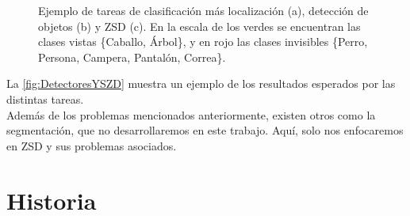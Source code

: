 \begin{figure}[]
  \centering
  \caption{Ejemplo de tareas de clasificación más localización (a), detección de objetos (b) y ZSD (c). En la escala de los verdes se encuentran las clases vistas \{Caballo, Árbol\}, y en rojo las clases invisibles \{Perro, Persona, Campera, Pantalón, Correa\}.}
  \label{fig:DetectoresYSZD}
\end{figure}

La \autoref{fig:DetectoresYSZD} muestra un ejemplo de los resultados esperados por las distintas tareas.\\

Además de los problemas mencionados anteriormente, existen otros como la segmentación, que no desarrollaremos en este trabajo. Aquí, solo nos enfocaremos en ZSD y sus problemas asociados.


\section{Historia} \label{sec:historia}


